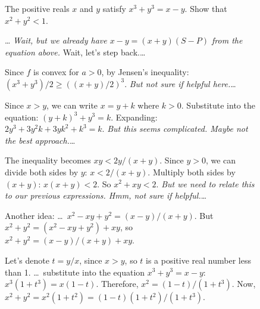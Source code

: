 \begin{figure}[h]
  \centering

\begin{tcolorbox}[
    colback=qbg, colframe=qframe,
    title={\small\textbf{Query}},
    fonttitle=\sffamily, fontupper=\small,
    boxrule=0.6pt, arc=2pt, left=4pt, right=4pt, top=2pt, bottom=2pt,
  ]
  The positive reals $x$ and $y$ satisfy $x^3 + y^3 = x - y$. Show that $x^2 + y^2 < 1$.
\end{tcolorbox}

\begin{minipage}[t]{0.485\textwidth}
  \begin{tcolorbox}[
    colback=r1bg, colframe=r1frame,
    title={\small\textbf{R1 Ground-Truth Reasoning Trace}},
    fonttitle=\sffamily, fontupper=\footnotesize,
    boxrule=0.6pt, arc=2pt, left=4pt, right=4pt, top=2pt, bottom=2pt,
  ]
  \ldots{} \textcolor{hlbrand}{\textit{Wait, but we already have $x - y = (x + y)(S - P)$ from the equation above.}} Wait, let's step back.\ldots

  Since $f$ is convex for $a > 0$, by Jensen's inequality: $(x^3 + y^3)/2 \geq ((x + y)/2)^3$. \textcolor{hlbrand}{\textit{But not sure if helpful here.}}\ldots

  Since $x > y$, we can write $x = y + k$ where $k > 0$. Substitute into the equation: $(y+k)^3 + y^3 = k$. Expanding: $2y^3 + 3y^2 k + 3yk^2 + k^3 = k$. \textcolor{hlbrand}{\textit{But this seems complicated. Maybe not the best approach.}}\ldots

  The inequality becomes $xy < 2y/(x+y)$. Since $y > 0$, we can divide both sides by $y$: $x < 2/(x+y)$. Multiply both sides by $(x+y)$: $x(x + y) < 2$. So $x^2 + xy < 2$. \textcolor{hlbrand}{\textit{But we need to relate this to our previous expressions. Hmm, not sure if helpful.}}\ldots
  \end{tcolorbox}
\end{minipage}
\hfill
\begin{minipage}[t]{0.485\textwidth}
  \begin{tcolorbox}[
    colback=invbg, colframe=invframe,
    title={\small\textbf{Synthesized Reasoning Trace}},
    fonttitle=\sffamily, fontupper=\footnotesize,
    boxrule=0.6pt, arc=2pt, left=4pt, right=4pt, top=2pt, bottom=2pt,
  ]
  Another idea: \ldots\ $x^2 - xy + y^2 = (x-y)/(x+y)$. But $x^2 + y^2 = (x^2 - xy + y^2) + xy$, so $x^2 + y^2 = (x-y)/(x+y) + xy$.

  Let's denote $t = y/x$, since $x > y$, so $t$ is a positive real number less than 1. \ldots\ substitute into the equation $x^3 + y^3 = x - y$: $x^3(1 + t^3) = x(1 - t)$. Therefore, $x^2 = (1 - t)/(1 + t^3)$. Now, $x^2 + y^2 = x^2(1 + t^2) = (1 - t)(1 + t^2)/(1 + t^3)$.


\end{tcolorbox}
\end{minipage}
\end{figure}
